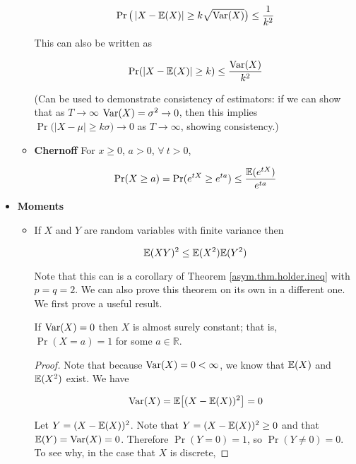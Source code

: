 \begin{itemize}
\begin{itemize}
\begin{theorem}
\[
\Pr \big(\left| X - \mathbb{E}(X) \right| \geq k \sqrt{\mathrm{Var}(X)} \big) \leq \frac{1}{k^2}
\] 

This can also be written as

\[
\Pr(|X - \mathbb{E}(X)| \geq k) \leq \frac{\mathrm{Var}(X)}{k^2}
\]
\end{theorem}

(Can be used to demonstrate consistency of estimators: if we can show that as \(T \to \infty\) \(\mathrm{Var}(X) = \sigma^2 \to 0\), then this implies \(\Pr \big(\left| X - \mu \right| \geq k \sigma \big) \to 0\) as \(T \to \infty\), showing consistency.)

\item \begin{theorem} \textbf{Chernoff} For \(x \geq 0\), \(a > 0\), \(\forall \ t > 0\),

\[
\Pr(X \geq a) = \Pr( e^{tX} \geq e^{ta} ) \leq \frac{\mathbb{E}(e^{tX})}{e^{ta}}
\]
\end{theorem} 
\end{itemize}

\item \textbf{Moments}

\begin{itemize}

\item \begin{theorem} \label{asym.cauchy.schwarz} If \(X\) and \(Y\) are random variables with finite variance then

\[
\mathbb{E}(XY)^2 \leq \mathbb{E}(X^2) \mathbb{E}(Y^2)
\]
\end{theorem}

Note that this can is a corollary of Theorem \ref{asym.thm.holder.ineq} with \(p = q = 2\). We can also prove this theorem on its own in a different one. We first prove a useful result.

\begin{lemma}\label{asym.cauchy.lemma}If \(\mathrm{Var}(X) = 0\) then \(X\) is almost surely constant; that is, \(\Pr(X = a) = 1\) for some \(a \in \mathbb{R}\).
\end{lemma}

\begin{proof}
Note that because \(\mathrm{Var}(X) = 0 < \infty\), we know that \(\mathbb{E}(X)\) and \(\mathbb{E}(X^2)\) exist. We have

\[
\mathrm{Var}(X) = \mathbb{E}\big[ (X - \mathbb{E}(X))^2 \big] = 0
\]

Let \(Y = (X - \mathbb{E}(X))^2 \). Note that \(Y = (X - \mathbb{E}(X))^2 \geq 0\) and that \(\mathbb{E}(Y) = \mathrm{Var}(X) = 0\). Therefore \(\Pr(Y=0) = 1\), so \(\Pr(Y \neq 0) = 0\). To see why, in the case that \(X\) is discrete,


\end{proof}
\end{itemize}
\end{itemize}
